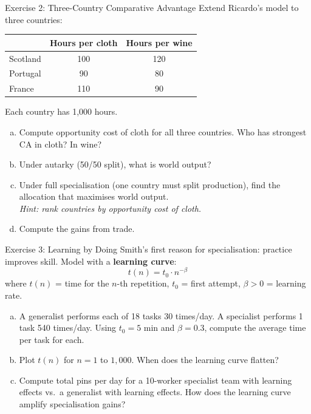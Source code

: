 \documentclass[aspectratio=169, 10pt]{beamer}
\begin{document}
\begin{frame}{Exercise 2: Three-Country Comparative Advantage}
Extend Ricardo's model to three countries:
\vspace{0.3em}
\begin{center}
\begin{tabular}{lcc}
\toprule
 & Hours per cloth & Hours per wine \\
\midrule
Scotland & 100 & 120 \\
Portugal & 90 & 80 \\
France   & 110 & 90 \\
\bottomrule
\end{tabular}
\end{center}
Each country has 1{,}000 hours.
\vspace{0.3em}
\begin{enumerate}[(a)]
  \item Compute opportunity cost of cloth for all three countries.
        Who has strongest CA in cloth? In wine?
  \item Under autarky (50/50 split), what is world output?
  \item Under full specialisation (one country must split production),
        find the allocation that maximises world output.\\
        \textit{Hint: rank countries by opportunity cost of cloth.}
  \item Compute the gains from trade.
\end{enumerate}
\end{frame}

\begin{frame}{Exercise 3: Learning by Doing}
Smith's first reason for specialisation: practice improves skill.
Model with a \textbf{learning curve}:
\[
  t(n) = t_0 \cdot n^{-\beta}
\]
where $t(n)$ = time for the $n$-th repetition, $t_0$ = first attempt,
$\beta > 0$ = learning rate.
\vspace{0.3em}
\begin{enumerate}[(a)]
  \item A generalist performs each of 18 tasks 30 times/day.
        A specialist performs 1 task 540 times/day.
        Using $t_0 = 5$ min and $\beta = 0.3$, compute the
        average time per task for each.
  \item Plot $t(n)$ for $n = 1$ to $1{,}000$.
        When does the learning curve flatten?
  \item Compute total pins per day for a 10-worker specialist team
        with learning effects vs.\ a generalist with learning effects.
        How does the learning curve \alert{amplify} specialisation gains?
\end{enumerate}
\end{frame}
\end{document}
